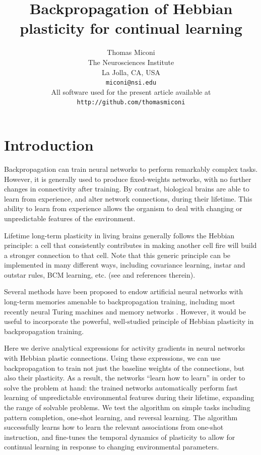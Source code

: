 \documentclass{article}
\title{Backpropagation of Hebbian plasticity for continual learning}
\author{
    Thomas Miconi\\
    The Neurosciences Institute\\
    La Jolla, CA, USA\\
    \texttt{miconi@nsi.edu}\\
    All software used for the present article available at
    \texttt{http://github.com/thomasmiconi}
}
\begin{document}
\maketitle

\section{Introduction}
Backpropagation can train neural networks to perform remarkably complex
tasks. However, it is generally used to produce fixed-weights networks, with no further changes in connectivity after training. 
By contrast, 
biological brains are able to learn from
experience, and alter network connections, during their lifetime. This ability to learn from experience allows the  organism to deal with changing or unpredictable features of the environment.

Lifetime long-term plasticity in living brains generally follows the Hebbian principle: a
cell that consistently contributes in making another cell fire will build a
stronger connection to that cell. Note that this generic principle can be
implemented in many different ways, including covariance learning, instar and
outstar rules, BCM learning, etc. (see \cite{Vasilkoski2011-ww} and references therein). 


Several methods have been proposed to endow artificial neural networks with
long-term memories amenable to backpropagation training,  including most
recently neural Turing machines \cite{Graves2014-ch,Santoro2016-jn} and memory
networks \cite{Sukhbaatar2015-ly}. However, it would be useful to incorporate
the powerful, well-studied principle of Hebbian plasticity in backpropagation
training.

Here we derive analytical expressions for activity gradients in neural networks with
Hebbian plastic connections. Using these expressions, we can use backpropagation
to train not just the baseline weights of the connections, but also their
plasticity. As a result, the networks ``learn how to learn''  in order to solve
the problem at hand: the trained networks automatically perform fast learning of
unpredictable environmental features during their lifetime, expanding the range
of solvable problems. We test the algorithm on simple tasks including pattern
completion, one-shot learning, and reversal learning.  The algorithm
successfully learns how to learn the relevant associations from one-shot
instruction, and fine-tunes the temporal dynamics of plasticity to allow for
continual learning in response to changing environmental parameters. 
\end{document}
